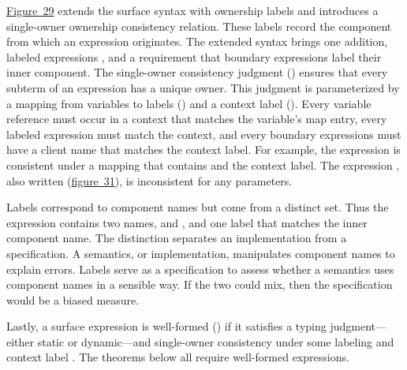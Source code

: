 \documentclass[ twoside,open=right,titlepage,numbers=noenddot,headinclude,%
                footinclude=true,cleardoublepage=empty,abstract=off,
                BCOR=5mm,paper=a4,fontsize=11pt,%
                ngerman,american,%
                parts,pdfspacing]{scrreprt}
\newcommand{\FigureRef}[2]{#1}
\begin{document}
\hyperref[t:x28counter_x28x22figurex22_x22figx3asurfacex2downershipx22x29x29]{Figure~\FigureRef{29}{t:x28counter_x28x22figurex22_x22figx3asurfacex2downershipx22x29x29}} extends the surface syntax
 with ownership labels and introduces a single{-}owner ownership consistency relation.
These labels record the component from which an expression originates.
The extended syntax brings one addition,
 labeled expressions \relax{$\obars{\sexpr}{\sowner}$},
 and a requirement that boundary expressions label their inner component.
The single{-}owner consistency judgment (\relax{$\sownerenv; \sowner \sWLsingle \sexpr$}) ensures
 that every subterm of an expression has a unique owner.
This judgment is parameterized by a mapping from variables to labels
 (\relax{$\sownerenv$}) and a context label (\relax{$\sowner$}).
Every variable reference must occur in a context that matches the variable{'}s
 map entry,
 every labeled expression must match the context,
 and every boundary expressions must have a client name that matches the
 context label.
For example, the expression
 is consistent under a mapping that contains 
 and the  context label.
The expression , also written
  (\hyperref[t:x28counter_x28x22figurex22_x22figx3aevaluationx2dmetax22x29x29]{figure~\FigureRef{31}{t:x28counter_x28x22figurex22_x22figx3aevaluationx2dmetax22x29x29}}),
 is inconsistent for any parameters.

Labels correspond to component names but come from a distinct set.
Thus the expression 
 contains two names,  and , and one label  that
 matches the inner component name.
The distinction separates an implementation from a specification.
A semantics, or implementation, manipulates component names to explain
 errors.
Labels serve as a specification to assess whether a semantics uses component names in a sensible way.
If the two could mix, then the specification would be a biased measure.

Lastly, a surface expression is well{-}formed
 (\relax{$\fwellformed{\sexpr}{\stoptional}$}) if it satisfies a typing judgment{---}either
 static or dynamic{---}and single{-}owner consistency under some labeling and context label .
The theorems below all require well{-}formed expressions.
\end{document}
